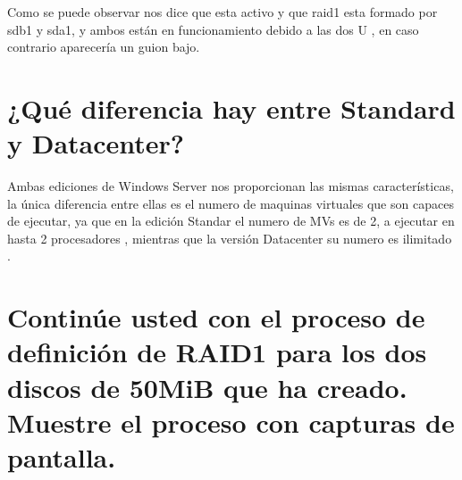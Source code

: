 	Como se puede observar nos dice que esta activo y que raid1 esta formado por  sdb1 y sda1, y ambos están en funcionamiento debido a las dos U , en caso contrario aparecería un guion bajo.
	
	

\section{¿Qué diferencia hay entre Standard y Datacenter?}

Ambas ediciones de Windows Server nos proporcionan las mismas características, la única diferencia entre ellas es el numero de maquinas virtuales que son capaces de ejecutar, ya que en la edición Standar el numero de MVs es de 2, a ejecutar en hasta 2 procesadores , mientras que la versión Datacenter su numero es ilimitado \cite{datacenterystandar}.

\section{Continúe usted con el proceso de definición de RAID1 para los dos discos de 50MiB que ha creado. Muestre el proceso con capturas de pantalla.}

